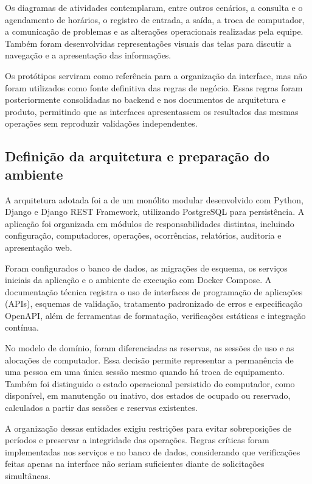 Os diagramas de atividades contemplaram, entre outros cenários, a consulta e o agendamento de horários, o registro de entrada, a saída, a troca de computador, a comunicação de problemas e as alterações operacionais realizadas pela equipe. Também foram desenvolvidas representações visuais das telas para discutir a navegação e a apresentação das informações.

Os protótipos serviram como referência para a organização da interface, mas não foram utilizados como fonte definitiva das regras de negócio. Essas regras foram posteriormente consolidadas no backend e nos documentos de arquitetura e produto, permitindo que as interfaces apresentassem os resultados das mesmas operações sem reproduzir validações independentes.


\subsection{Definição da arquitetura e preparação do ambiente}

A arquitetura adotada foi a de um monólito modular desenvolvido com Python, Django e Django REST Framework, utilizando PostgreSQL para persistência. A aplicação foi organizada em módulos de responsabilidades distintas, incluindo configuração, computadores, operações, ocorrências, relatórios, auditoria e apresentação web.

Foram configurados o banco de dados, as migrações de esquema, os serviços iniciais da aplicação e o ambiente de execução com Docker Compose. A documentação técnica registra o uso de interfaces de programação de aplicações (APIs), esquemas de validação, tratamento padronizado de erros e especificação OpenAPI, além de ferramentas de formatação, verificações estáticas e integração contínua.

No modelo de domínio, foram diferenciadas as reservas, as sessões de uso e as alocações de computador. Essa decisão permite representar a permanência de uma pessoa em uma única sessão mesmo quando há troca de equipamento. Também foi distinguido o estado operacional persistido do computador, como disponível, em manutenção ou inativo, dos estados de ocupado ou reservado, calculados a partir das sessões e reservas existentes.

A organização dessas entidades exigiu restrições para evitar sobreposições de períodos e preservar a integridade das operações. Regras críticas foram implementadas nos serviços e no banco de dados, considerando que verificações feitas apenas na interface não seriam suficientes diante de solicitações simultâneas.


